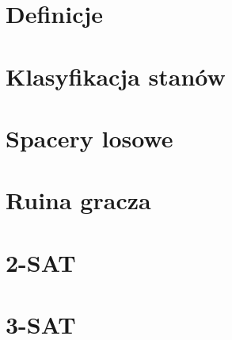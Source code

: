 \section{Definicje}


\newpage
\section{Klasyfikacja stanów}


\newpage
\section{Spacery losowe}


\newpage
\section{Ruina gracza} 


\newpage
\section{2-SAT}


\newpage
\section{3-SAT}

